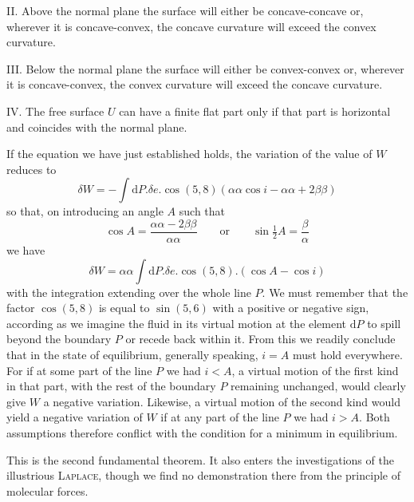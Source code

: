 II. Above the normal plane the surface will either be concave-concave or, wherever it is concave-convex, the concave curvature will exceed the convex curvature.

III. Below the normal plane the surface will either be convex-convex or, wherever it is concave-convex, the convex curvature will exceed the concave curvature.

IV. The free surface $U$ can have a finite flat part only if that part is horizontal and coincides with the normal plane.

If the equation we have just established holds, the variation of the value of $W$ reduces to
\[
\delta W=-\int\mathrm{d}P.\delta e.\cos(5,8)(\alpha\alpha\cos i-\alpha\alpha+2\beta\beta)
\]
so that, on introducing an angle $A$ such that
\[
\cos A=\frac{\alpha\alpha-2\beta\beta}{\alpha\alpha}\qquad\text{or}\qquad\sin\tfrac12 A=\frac\beta\alpha
\]
we have
\[
\delta W=\alpha\alpha\int\mathrm{d}P.\delta e.\cos(5,8).(\cos A-\cos i)
\]
with the integration extending over the whole line $P$. We must remember that the factor $\cos(5,8)$ is equal to $\sin(5,6)$ with a positive or negative sign, according as we imagine the fluid in its virtual motion at the element $\mathrm{d}P$ to spill beyond the boundary $P$ or recede back within it. From this we readily conclude that in the state of equilibrium, generally speaking, $i=A$ must hold everywhere. For if at some part of the line $P$ we had $i<A$, a virtual motion of the first kind in that part, with the rest of the boundary $P$ remaining unchanged, would clearly give $W$ a negative variation. Likewise, a virtual motion of the second kind would yield a negative variation of $W$ if at any part of the line $P$ we had $i>A$. Both assumptions therefore conflict with the condition for a minimum in equilibrium.

This is the second fundamental theorem. It also enters the investigations of the illustrious \textsc{Laplace}, though we find no demonstration there from the principle of molecular forces.

